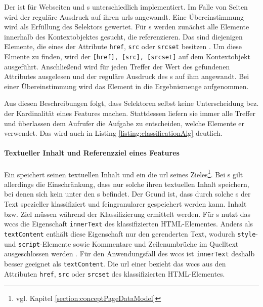     Der {\urlSelector} ist für Webseiten und {}s unterschiedlich implementiert.
    Im Falle von Seiten wird der reguläre Ausdruck auf ihren \glspl{url} angewandt.
    Eine Übereinstimmung wird als Erfüllung des Selektors gewertet.
    Für {}s werden zunächst alle Elemente innerhalb des Kontextobjektes gesucht, die {\resources} referenzieren.
    Das sind diejenigen Elemente, die eines der Attribute \texttt{href}, \texttt{src} oder \texttt{srcset} besitzen
    \cite[Kapitel 4.7 \& 4.8]{w3c:html5}.
    Um diese Elmente zu finden, wird der {\cssSelector} \texttt{[href], [src], [srcset]} auf dem Kontextobjekt ausgeführt.
    Anschließend wird für jeden Treffer der Wert des gefundenen Attributes ausgelesen
    und der reguläre Ausdruck des {\urlSelector}s auf ihm angewandt.
    Bei einer Übereinstimmung wird das Element in die Ergebnismenge aufgenommen.

    Aus diesen Beschreibungen folgt, dass Selektoren selbst keine Unterscheidung bez.
    der Kardinalität eines Features machen.
    Stattdessen liefern sie immer alle Treffer und überlassen dem Aufrufer die Aufgabe zu entscheiden,
    welche Elemente er verwendet.
    Das wird auch in Listing \ref{listing:classificationAlg} deutlich.

    \paragraph{Textueller Inhalt und Referenzziel eines Features}
    Ein {\contentFeature} speichert seinen textuellen Inhalt und ein {}
    die \gls{url} seines Zieles\footnote{vgl. Kapitel \ref{section:conceptPageDataModel}}.
    Bei {\contentFeature}s gilt allerdings die Einschränkung, dass nur solche ihren textuellen Inhalt speichern,
    bei denen sich kein {\contentFeature} unter den {\childFeature}s befindet.
    Der Grund ist, dass durch solche {\childFeature}s der Text spezieller klassifiziert und
    feingranularer gespeichert werden kann.
    Inhalt bzw. Ziel müssen während der Klassifizierung ermittelt werden.
    Für {\contentFeature}s nutzt das \gls{wccs} die Eigenschaft \texttt{innerText} des klassifizierten HTML-Elementes.
    Anders als \texttt{textContent} enthält diese Eigenschaft nur den gerenderten Text,
    wodurch \texttt{style}- und \texttt{script}-Elemente sowie Kommentare und Zeilenumbrüche im Quelltext
    ausgeschlossen werden
    \cite[Kapitel 3.2.7]{whatwg:html}.
    Für den Anwendungsfall des \gls{wccs} ist \texttt{innerText} deshalb besser geeignet als \texttt{textContent}.
    Die \gls{url} einer {\resource} bezieht das \gls{wccs} aus den Attributen
    \texttt{href}, \texttt{src} oder \texttt{srcset} des klassifizierten HTML-Elementes.

